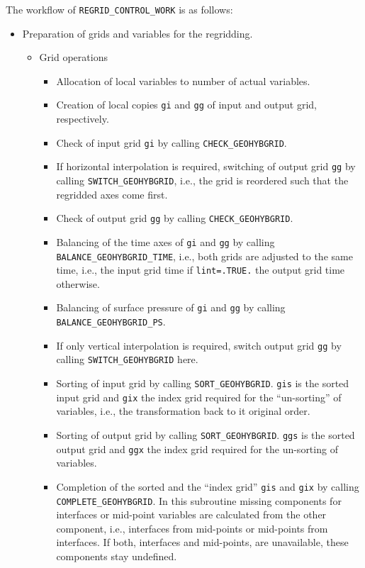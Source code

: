 \documentclass[11pt,twoside]{article}
\begin{document}
The workflow of \verb|REGRID_CONTROL_WORK| is as follows:
\begin{itemize} %
\item Preparation of grids and variables for the regridding.
\begin{itemize} %
\item Grid operations
\begin{itemize}%
\item Allocation of local variables to number of actual variables.
\item Creation of local copies \verb|gi| and \verb|gg| of input and
output grid, respectively.
\item Check of input grid \verb|gi| by calling \verb|CHECK_GEOHYBGRID|.
\item If horizontal interpolation is required, switching of output
grid \verb|gg| by calling \verb|SWITCH_GEOHYBGRID|, i.e., the grid is
reordered such that the regridded axes come first.
\item  Check of output grid \verb|gg| by calling \verb|CHECK_GEOHYBGRID|.
\item Balancing of the time axes of \verb|gi| and \verb|gg| by
calling \verb|BALANCE_GEOHYBGRID_TIME|, i.e., both grids are adjusted
to the same time, i.e., the input grid time if \verb|lint=.TRUE.| the
output grid time otherwise.
\item Balancing of surface pressure of \verb|gi| and \verb|gg| by
calling \verb|BALANCE_GEOHYBGRID_PS|. 
\item If only vertical interpolation is required, switch output
grid \verb|gg|  by calling \verb|SWITCH_GEOHYBGRID| here.
\item Sorting of input  grid by calling \verb|SORT_GEOHYBGRID|.  
\verb|gis| is the sorted input grid and \verb|gix| the index grid 
required for the ``un-sorting'' of variables, i.e., the transformation
back to it original order.
\item Sorting of output grid by calling \verb|SORT_GEOHYBGRID|.
\verb|ggs| is the sorted output grid and \verb|ggx| the index grid
required for the un-sorting of variables.
\item Completion of the sorted and the ``index grid'' \verb|gis|
and \verb|gix| by calling \verb|COMPLETE_GEOHYBGRID|. In this
subroutine missing components for interfaces or mid-point variables
are calculated from the other component, i.e., interfaces from
mid-points or mid-points from interfaces. If both, interfaces and mid-points,
are unavailable, these components stay undefined.

\end{itemize}
\end{itemize}
\end{itemize}
\end{document}
